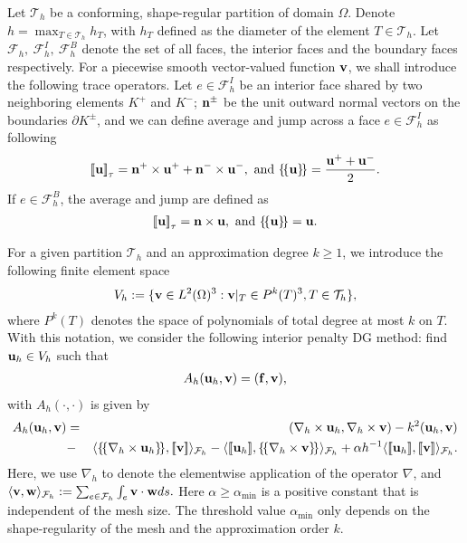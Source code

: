 \documentclass[final,leqno]{siamltex704}
\newcommand{\bn}{{\bf n}}
\newcommand{\bv}{{\bf v}}
\def\bbf{{\bf f}}
\def\bn{{\bf n}}
\def\bu{{\bf u}}
\def\bv{{\bf v}}
\def\bw{{\bf w}}
\def\ljump{{[\![}}
\def\rjump{{]\!]}}
\def\lavg{{\{\!\{}}
\def\ravg{{\}\!\}}}
\begin{document}
\vspace{5pt}
Let $\mathcal{T}_h$ be a conforming, shape-regular partition of domain $\Omega$. Denote $h=\max_{T\in\mathcal{T}_h}h_T$, with $h_T$ defined as the diameter of the element $T\in\mathcal{T}_h$. Let $\mathcal{F}_h,\ \mathcal{F}_h^I,\ \mathcal{F}_h^B$ denote the set of all faces, the interior faces and the boundary faces respectively. 
For a piecewise smooth vector-valued function $\bv$, we shall introduce the following trace operators. Let $e\in\mathcal{F}_h^I$ be an interior face shared by two neighboring elements $K^+$ and $K^-$; $\bn^\pm$ be the unit outward normal vectors on the boundaries $\partial K^\pm$, and we can define average and jump across a face $e\in\mathcal{F}_h^I$ as following
\begin{eqnarray*}
\ljump \bu \rjump_{\tau}={\bf n}^+\times\bu^++{\bf n}^-\times\bu^-,\mbox{ and }\lavg \bu\ravg=\frac{\bu^++\bu^-}{2}.
\end{eqnarray*}
If $e\in\mathcal{F}_h^B$, the average and jump are defined as
\begin{eqnarray*}
\ljump \bu \rjump_{\tau}={\bf n}\times\bu,\mbox{ and } \lavg\bu\ravg=\bu.
\end{eqnarray*}


For a given partition $\mathcal{T}_h$ and an approximation degree $k\ge 1$, we introduce the following finite element space
\begin{eqnarray}
V_h:=\{\bv\in L^2(\Omega)^3:\bv|_T\in P^k(T)^3,T\in\mathcal{T}_h\},
\end{eqnarray}
where $P^k(T)$ denotes the space of polynomials of total degree at most $k$ on $T$. With this notation, we consider the following interior penalty DG method: find $\bu_h\in V_h$ such that
\begin{eqnarray}
A_h(\bu_h,\bv)=(\bbf,\bv),
\end{eqnarray}
with $A_h(\cdot,\cdot)$ is given by
\begin{eqnarray}
A_h(\bu_h,\bv)&=&(\nabla_h\times \bu_h,\nabla_h\times \bv)-k^2(\bu_h,\bv)\notag\\
&-&\langle\lavg\nabla_h\times \bu_h\ravg,\ljump \bv\rjump\rangle_{\mathcal{F}_h}-\langle\ljump \bu_h\rjump,\lavg\nabla_h\times \bv\ravg\rangle_{\mathcal{F}_h}
+\alpha h^{-1}\langle\ljump \bu_h\rjump,\ljump \bv\rjump\rangle_{\mathcal{F}_h}.
\end{eqnarray}
Here, we use $\nabla_h$ to denote the elementwise application of the operator $\nabla$, and $\langle \bv, \bw\rangle_{\mathcal{F}_h}:=\sum_{e\in\mathcal{F}_h}\int_e \bv\cdot\bw ds.$
Here $\alpha\ge \alpha_{\min}$ is a positive constant that is independent of the mesh size. The threshold value $\alpha_{\min}$ only depends on the shape-regularity of the mesh and the approximation order $k$.
\end{document}
